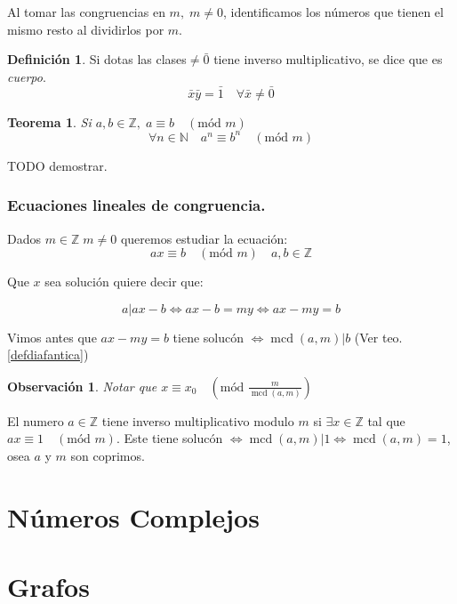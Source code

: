 \documentclass[9pt,a4paper,draft]{article}
\theoremstyle{definition}
\newtheorem{defi}{Definición}
\theoremstyle{plain}
\newtheorem{teo}{Teorema}
\newtheorem{obs}{Observación}
\DeclareMathOperator{\mcd}{mcd}
\newcommand{\modu}[1]{\quad(\text{mód }#1)}
\begin{document}
Al tomar las congruencias en $m,\; m\neq{0}$, identificamos los números que tienen el mismo resto al dividirlos por $m$.

\begin{defi} Si dotas las clases$\neq\bar{0}$ tiene inverso multiplicativo, se dice que es {\itshape  cuerpo}.
$$\bar{x}\bar{y}=\bar{1}\quad \forall{\bar{x}\neq\bar{0}}$$
\end{defi}

\begin{teo} Si $a,b\in{\mathbb{Z}},\; a\equiv{b}\modu{m}$
$$\forall{n\in{\mathbb{N}}}\quad a^n\equiv{b^n}\modu{m}$$
\end{teo} TODO demostrar.

\section{Ecuaciones lineales de congruencia.}

Dados $m\in{\mathbb{Z}}\; m\neq{0}$ queremos estudiar la ecuación:
$$ax\equiv{b}\modu{m}\quad a,b\in{\mathbb{Z}}$$

Que $x$ sea solución quiere decir que:

$$a|ax-b \iff ax-b=my \iff ax-my=b$$

Vimos antes que $ax-my=b$ tiene solucón $\iff \mcd(a,m)|b$ (Ver teo. \ref{defdiafantica})

\begin{obs}
Notar que $x\equiv{x_0}\modu{\frac{m}{\mcd(a,m)}}$
\end{obs}

El numero $a\in{\mathbb{Z}}$ tiene inverso multiplicativo modulo $m$ si $\exists x\in{\mathbb{Z}}$ tal que $ax\equiv{1}\modu{m}$. Este tiene solucón $\iff\mcd(a,m)|1 \iff \mcd(a,m)=1$, osea $a$ y $m$ son coprimos.

\part{Números Complejos}

\part{Grafos}
\end{document}
